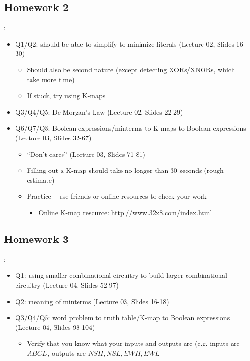 \documentclass{../slides}
\begin{document}
\subsection{Homework 2}
\begin{frame}{\secname: \subsecname}
    \begin{itemize}
        \item Q1/Q2: should be able to simplify to minimize literals (Lecture 02, Slides 16-30)
        \begin{itemize}
            \item Should also be second nature (except detecting XORs/XNORs, which take more time)
            \item If stuck, try using K-maps %
        \end{itemize}
        \item Q3/Q4/Q5: De Morgan's Law (Lecture 02, Slides 22-29)
        \item Q6/Q7/Q8: Boolean expressions/minterms to K-maps to Boolean expressions (Lecture 03, Slides 32-67)
        \begin{itemize}
            \item \enquote{Don't cares} (Lecture 03, Slides 71-81)
            \item Filling out a K-map should take no longer than $30$ seconds (rough estimate)
            \item Practice -- use friends or online resources to check your work
            \begin{itemize}
                \item Online K-map resource: \url{http://www.32x8.com/index.html}
            \end{itemize}
        \end{itemize}
    \end{itemize}
\end{frame}

\subsection{Homework 3}
\begin{frame}{\secname: \subsecname}
    \begin{itemize}
        \item Q1: using smaller combinational circuitry to build larger combinational circuitry (Lecture 04, Slides 52-97)
        \item Q2: meaning of minterms (Lecture 03, Slides 16-18)
        \item Q3/Q4/Q5: word problem to truth table/K-map to Boolean expressions (Lecture 04, Slides 98-104)
        \begin{itemize}
            \item Verify that you know what your inputs and outputs are (e.g. inputs are $ABCD$, outputs are $NSH, NSL, EWH, EWL$
        \end{itemize}
    \end{itemize}
\end{frame}
\end{document}
